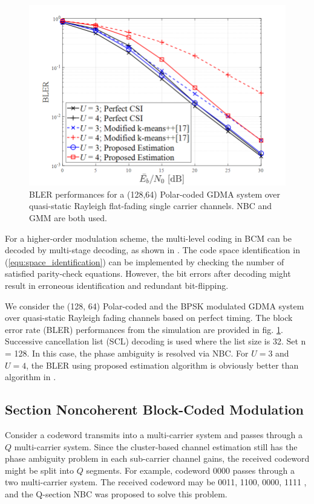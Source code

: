 \begin{figure}[t!]
 \centering
 \includegraphics[width=15cm]{fig/bler_polar_channel_estimation.png}
 \caption{BLER performances for a (128,64) Polar-coded GDMA system over
quasi-static Rayleigh flat-fading single carrier channels. NBC and GMM are both used.}
 \label{fig:bler_polar_channel_estimation}
\end{figure}


For a higher-order modulation scheme, the multi-level coding in BCM can be decoded by multi-stage decoding, as shown in \cite{nbc05}. The code space identification in (\ref{equ:space_identification}) can be implemented by checking the number of satisfied parity-check equations. However, the bit errors after decoding might result in erroneous identification and redundant bit-flipping. 

We consider the (128, 64) Polar-coded and the BPSK modulated GDMA system over quasi-static Rayleigh fading channels based on perfect timing. The block error rate (BLER) performances from the simulation are provided in fig. \ref{fig:bler_polar_channel_estimation}. Successive cancellation list (SCL) decoding is used where the list size is 32. Set n = 128. In this case, the phase ambiguity is resolved via NBC. For $U = 3$ and $U = 4$, the BLER using proposed estimation algorithm is obviously better than algorithm in \cite{hsu2020uplink}.

\subsection{Section Noncoherent Block-Coded Modulation}

Consider a codeword transmits into a multi-carrier system and passes through a $Q$ multi-carrier system. Since the cluster-based channel estimation still has the phase ambiguity problem in each sub-carrier channel gains, the received codeword might be split into $Q$ segments. For example, codeword 0000 passes through a two multi-carrier system. The received codeword may be 0011, 1100, 0000, 1111 , and the Q-section NBC was proposed to solve this problem.

